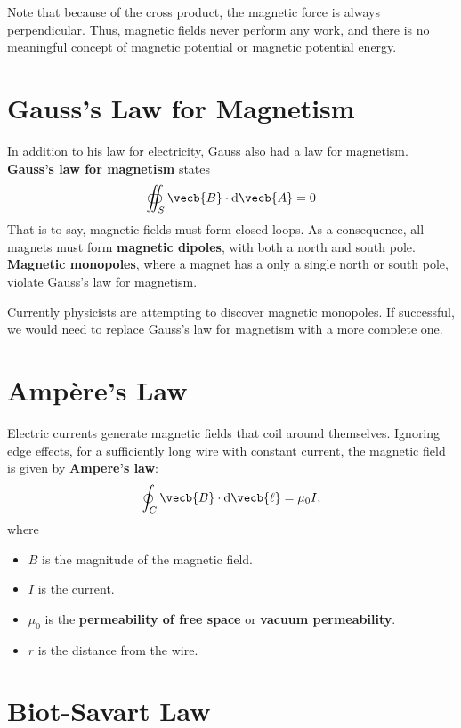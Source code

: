 Note that because of the cross product,
the magnetic force is always perpendicular.
Thus, magnetic fields never perform any work,
and there is no meaningful concept of magnetic potential
or magnetic potential energy.

\section{Gauss's Law for Magnetism}

In addition to his law for electricity, Gauss also had a law for magnetism.
\textbf{Gauss's law for magnetism} states
\begin{equation} \label{eq:gausss-law-magnetism}
    \oiint_S \vecb{B} \cdot \odif{\vecb{A}} = 0
\end{equation}
That is to say, magnetic fields must form closed loops.
As a consequence, all magnets must form \textbf{magnetic dipoles},
with both a north and south pole.
\textbf{Magnetic monopoles},
where a magnet has a only a single north or south pole,
violate Gauss's law for magnetism.

Currently physicists are attempting to discover magnetic monopoles.
If successful,
we would need to replace Gauss's law for magnetism with a more complete one.

\section{Ampère's Law}

Electric currents generate magnetic fields that coil around themselves.
Ignoring edge effects, for a sufficiently long wire with constant current,
the magnetic field is given by \textbf{Ampere's law}:
\begin{equation} \label{eq:amperes-law}
    \oint_C \vecb{B} \cdot \odif{\vecb{\ell}} = \mu_0 I,
\end{equation}
where
\begin{itemize}
    \item \(B\) is the magnitude of the magnetic field.
    \item \(I\) is the current.
    \item \(\mu_0\) is the \textbf{permeability of free space} or
        \textbf{vacuum permeability}.
    \item \(r\) is the distance from the wire.
\end{itemize}

\section{Biot-Savart Law}


